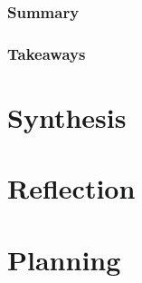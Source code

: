 \documentclass[
	letterpaper, %
]{jdf}
\begin{document}
\subsubsection{Summary}


\subsubsection{Takeaways}


\section{Synthesis}



\section{Reflection}


\section{Planning}


\printbibliography{}
\end{document}
